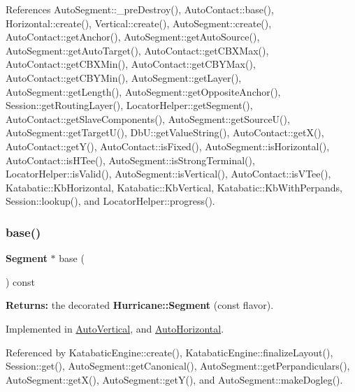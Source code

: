 References Auto\+Segment\+::\+\_\+pre\+Destroy(), Auto\+Contact\+::base(), Horizontal\+::create(), Vertical\+::create(), Auto\+Segment\+::create(), Auto\+Contact\+::get\+Anchor(), Auto\+Segment\+::get\+Auto\+Source(), Auto\+Segment\+::get\+Auto\+Target(), Auto\+Contact\+::get\+C\+B\+X\+Max(), Auto\+Contact\+::get\+C\+B\+X\+Min(), Auto\+Contact\+::get\+C\+B\+Y\+Max(), Auto\+Contact\+::get\+C\+B\+Y\+Min(), Auto\+Segment\+::get\+Layer(), Auto\+Segment\+::get\+Length(), Auto\+Segment\+::get\+Opposite\+Anchor(), Session\+::get\+Routing\+Layer(), Locator\+Helper\+::get\+Segment(), Auto\+Contact\+::get\+Slave\+Components(), Auto\+Segment\+::get\+Source\+U(), Auto\+Segment\+::get\+Target\+U(), Db\+U\+::get\+Value\+String(), Auto\+Contact\+::get\+X(), Auto\+Contact\+::get\+Y(), Auto\+Contact\+::is\+Fixed(), Auto\+Segment\+::is\+Horizontal(), Auto\+Contact\+::is\+H\+Tee(), Auto\+Segment\+::is\+Strong\+Terminal(), Locator\+Helper\+::is\+Valid(), Auto\+Segment\+::is\+Vertical(), Auto\+Contact\+::is\+V\+Tee(), Katabatic\+::\+Kb\+Horizontal, Katabatic\+::\+Kb\+Vertical, Katabatic\+::\+Kb\+With\+Perpands, Session\+::lookup(), and Locator\+Helper\+::progress().

\mbox{\label{classKatabatic_1_1AutoSegment_a53877ff5ef48eb0030c2581a6eeb3c09}} 
\subsubsection{\texorpdfstring{base()}{base()}\hspace{0.1cm}{\footnotesize\ttfamily [1/2]}}
{\footnotesize\ttfamily \textbf{ Segment} $\ast$ base (\begin{DoxyParamCaption}{ }\end{DoxyParamCaption}) const\hspace{0.3cm}{\ttfamily [pure virtual]}}

{\bfseries Returns\+:} the decorated \textbf{ Hurricane\+::\+Segment} (const flavor). 

Implemented in \hyperlink{classKatabatic_1_1AutoVertical_a6f14a3faa93f2c610ea0d2cc7d903706}{Auto\+Vertical}, and \hyperlink{classKatabatic_1_1AutoHorizontal_a6f14a3faa93f2c610ea0d2cc7d903706}{Auto\+Horizontal}.



Referenced by Katabatic\+Engine\+::create(), Katabatic\+Engine\+::finalize\+Layout(), Session\+::get(), Auto\+Segment\+::get\+Canonical(), Auto\+Segment\+::get\+Perpandiculars(), Auto\+Segment\+::get\+X(), Auto\+Segment\+::get\+Y(), and Auto\+Segment\+::make\+Dogleg().

